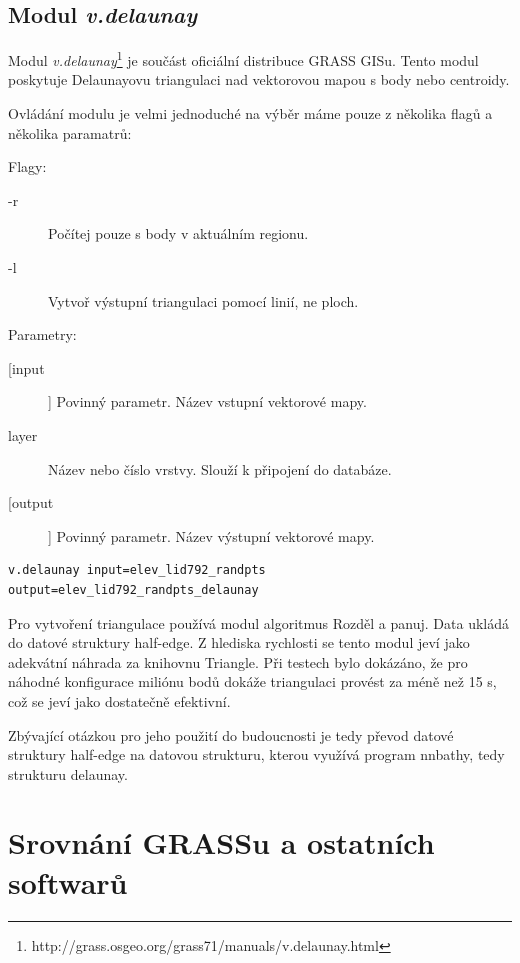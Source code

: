\documentclass[12pt,a4paper]{article}
\begin{document}
\newpage
\subsection{Modul \textit{v.delaunay}}
Modul \textit{v.delaunay}\footnote{http://grass.osgeo.org/grass71/manuals/v.delaunay.html} je součást oficiální distribuce GRASS GISu. Tento modul poskytuje Delaunayovu triangulaci nad vektorovou mapou s body nebo centroidy. 

Ovládání modulu je velmi jednoduché na výběr máme pouze z několika flagů a několika paramatrů:

\bigskip
Flagy:
\begin{description}
\item[-r] Počítej pouze s body v aktuálním regionu.
\item[-l] Vytvoř výstupní triangulaci pomocí linií, ne ploch.
\end{description}
\bigskip
Parametry:
\begin{description}
\item[[input]] Povinný parametr. Název vstupní vektorové mapy.
\item[layer] Název nebo číslo vrstvy. Slouží k připojení do databáze.
\item[[output]] Povinný parametr. Název výstupní vektorové mapy.
\end{description}

\begin{lstlisting}[caption={Volání modulu v.delaunay z příkazové řádky}]
v.delaunay input=elev_lid792_randpts output=elev_lid792_randpts_delaunay
\end{lstlisting}


Pro vytvoření triangulace používá modul algoritmus Rozděl a panuj. Data ukládá do datové struktury half-edge. Z hlediska rychlosti se tento modul jeví jako adekvátní náhrada za knihovnu Triangle. Při testech bylo dokázáno, že pro náhodné konfigurace miliónu bodů dokáže triangulaci provést za méně než 15 s, což se jeví jako dostatečně efektivní.

Zbývající otázkou pro jeho použití do budoucnosti je tedy převod datové struktury half-edge na datovou strukturu, kterou využívá program nnbathy, tedy strukturu delaunay.


\newpage
\section{Srovnání GRASSu a ostatních softwarů}
\end{document}
